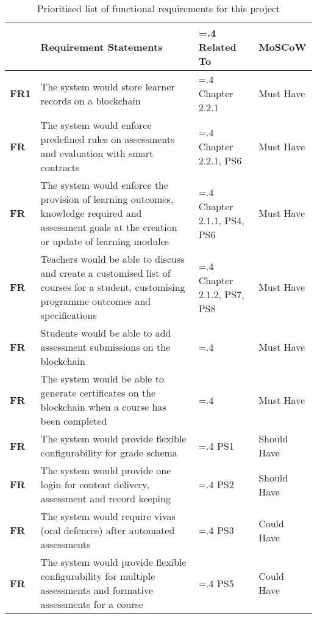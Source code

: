 \begin{table}[!h] 
    \caption{Prioritised list of functional requirements for this project}
    \centering
    \label{table:fx-reqs}
    \begin{tabularx}{\textwidth}{>{\bfseries}l>{\hsize=1.6\hsize}X>{\hsize=.4\hsize}Xl}
        & Requirement Statements & Related To & MoSCoW\\
        \toprule
        FR1 & The system would store learner records on a blockchain 
        & Chapter 2.2.1 & Must Have\\\midrule
        FR & The system would enforce predefined rules on assessments and evaluation with 
        smart contracts & Chapter 2.2.1, PS6 & Must Have\\\midrule
        FR & The system would enforce the provision of learning outcomes, knowledge required 
        and assessment goals at the creation or update of learning modules & Chapter 2.1.1, 
        PS4, PS6 & Must Have\\\midrule
        FR & Teachers would be able to discuss and create a customised list of courses 
        for a student, customising programme outcomes and specifications 
        & Chapter 2.1.2, PS7, PS8 & Must Have\\\midrule
        FR & Students would be able to add assessment submissions on the blockchain 
        &  & Must Have\\\midrule
        FR & The system would be able to generate certificates on the blockchain when a course 
        has been completed &  & Must Have\\\midrule
        FR & The system would provide flexible configurability for grade schema & PS1
        & Should Have\\\midrule
        FR & The system would provide one login for content delivery, assessment and 
        record keeping & PS2 & Should Have\\\midrule
        FR & The system would require vivas (oral defences) after automated assessments & 
        PS3 & Could Have\\\midrule
        FR & The system would provide flexible configurability for multiple assessments and 
        formative assessments for a course & PS5 & Could Have\\
        \bottomrule
    \end{tabularx}
\end{table}

